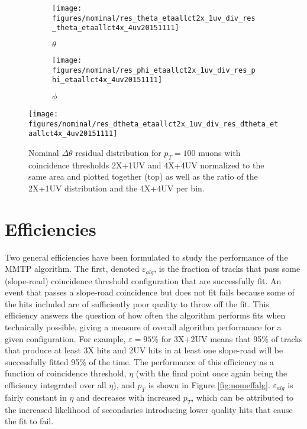 \begin{figure}[!htbp]\captionsetup{justification=centering}\captionsetup{justification=centering}
  \begin{center}
\begin{subfigure}[t]{0.32\textwidth\textwidth}\centering\texttt{[image: figures/nominal/res\_theta\_etaallct2x\_1uv\_div\_res\_theta\_etaallct4x\_4uv20151111]}\caption{$\theta$}\end{subfigure}
\begin{subfigure}[t]{0.32\textwidth\textwidth}\centering\texttt{[image: figures/nominal/res\_phi\_etaallct2x\_1uv\_div\_res\_phi\_etaallct4x\_4uv20151111]}\caption{$\phi$}\end{subfigure}
  \texttt{[image: figures/nominal/res\_dtheta\_etaallct2x\_1uv\_div\_res\_dtheta\_etaallct4x\_4uv20151111]}
  \caption{\label{fig:nomperf2x1uv}Nominal $\Delta\theta$ residual distribution for $p_T=100$ \GeV muons with coincidence thresholds 2X+1UV and 4X+4UV normalized to the same area and plotted together (top) as well as the ratio of the 2X+1UV distribution and the 4X+4UV per bin.}
  \end{center}
\end{figure}
\clearpage
\section{Efficiencies}
Two general efficiencies have been formulated to study the performance of the MMTP algorithm.  The first, denoted $\varepsilon_{alg}$, is the fraction of tracks that pass some (slope-road) coincidence threshold configuration that are successfully fit.  An event that passes a slope-road coincidence but does not fit fails because some of the hits included are of sufficiently poor quality to throw off the fit.  This efficiency answers the question of how often the algorithm performs fits when technically possible, giving a measure of overall algorithm performance for a given configuration.  For example, $\varepsilon=95$\% for 3X+2UV means that 95\% of tracks that produce at least 3X hits and 2UV hits in at least one slope-road will be successfully fitted 95\% of the time.  The performance of this efficiency as a function of coincidence threshold, $\eta$ (with the final point once again being the efficiency integrated over all $\eta$), and $p_T$ is shown in Figure \ref{fig:nomeffalg}.  $\varepsilon_{alg}$ is fairly constant in $\eta$ and decreases with increased $p_T$, which can be attributed to the increased likelihood of secondaries introducing lower quality hits that cause the fit to fail.

